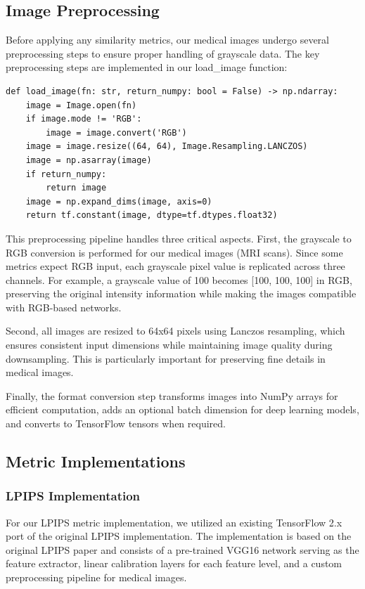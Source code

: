 \documentclass[a4paper,12pt]{article}
\begin{document}
\subsection{Image Preprocessing}
Before applying any similarity metrics, our medical images undergo several preprocessing steps to ensure proper handling of grayscale data. The key preprocessing steps are implemented in our load_image function:

\begin{verbatim}
def load_image(fn: str, return_numpy: bool = False) -> np.ndarray:
    image = Image.open(fn)
    if image.mode != 'RGB':
        image = image.convert('RGB')
    image = image.resize((64, 64), Image.Resampling.LANCZOS)
    image = np.asarray(image)
    if return_numpy:
        return image
    image = np.expand_dims(image, axis=0)
    return tf.constant(image, dtype=tf.dtypes.float32)
\end{verbatim}

This preprocessing pipeline handles three critical aspects. First, the grayscale to RGB conversion is performed for our medical images (MRI scans). Since some metrics expect RGB input, each grayscale pixel value is replicated across three channels. For example, a grayscale value of 100 becomes [100, 100, 100] in RGB, preserving the original intensity information while making the images compatible with RGB-based networks.

Second, all images are resized to 64x64 pixels using Lanczos resampling, which ensures consistent input dimensions while maintaining image quality during downsampling. This is particularly important for preserving fine details in medical images.

Finally, the format conversion step transforms images into NumPy arrays for efficient computation, adds an optional batch dimension for deep learning models, and converts to TensorFlow tensors when required.

\subsection{Metric Implementations}

\subsubsection{LPIPS Implementation}
For our LPIPS metric implementation, we utilized an existing TensorFlow 2.x port of the original LPIPS implementation. The implementation is based on the original LPIPS paper \cite{zhang_unreasonable_2018} and consists of a pre-trained VGG16 network serving as the feature extractor, linear calibration layers for each feature level, and a custom preprocessing pipeline for medical images.
\end{document}
